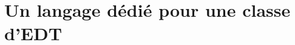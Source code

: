 \documentclass{beamer}
\begin{document}


\section{Un langage dédié pour une classe d'EDT}

\end{document}
